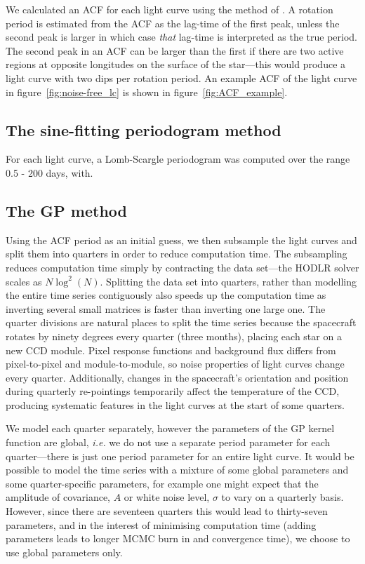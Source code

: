 We calculated an ACF for each light curve using the method of
\citet{mcquillan13}.
A rotation period is estimated from the ACF as the lag-time of the first peak,
unless the second peak is larger in which case {\it that} lag-time is
interpreted as the true period.
The second peak in an ACF can be larger than the first if there are two active
regions at opposite longitudes on the surface of the star---this would produce
a light curve with two dips per rotation period.
An example ACF of the light curve in figure~\ref{fig:noise-free_lc} is shown
in figure~\ref{fig:ACF_example}.

\subsection{The sine-fitting periodogram method}

For each light curve, a Lomb-Scargle periodogram was computed over the range
0.5 - 200 days, with.

\subsection{The GP method}

Using the ACF period as an initial guess, we then subsample the light curves
and split them into \kepler quarters in order to reduce computation time.
The subsampling reduces computation time simply by contracting the data
set---the HODLR solver scales as $N \log ^2 (N)$.
Splitting the data set into quarters, rather than modelling the entire time
series contiguously also speeds up the computation time as inverting several
small matrices is faster than inverting one large one.
The \kepler quarter divisions are natural places to split the time series
because the spacecraft rotates by ninety degrees every quarter (three months),
placing each star on a new CCD module.
Pixel response functions and background flux differs from pixel-to-pixel and
module-to-module, so noise properties of \kepler light curves change every
quarter.
Additionally, changes in the spacecraft's orientation and position during
quarterly re-pointings temporarily affect the temperature of the CCD,
producing systematic features in the light curves at the start of some
quarters.

We model each quarter separately, however the parameters of the GP kernel
function are global, {\it i.e.} we do not use a separate period parameter for
each quarter---there is just one period parameter for an entire light curve.
It would be possible to model the time series with a mixture of some global
parameters and some quarter-specific parameters, for example one might expect
that the amplitude of covariance, $A$ or white noise level, $\sigma$ to vary
on a quarterly basis.
However, since there are seventeen quarters this would lead to thirty-seven
parameters, and in the interest of minimising computation time (adding
parameters leads to longer MCMC burn in and convergence time), we choose to
use global parameters only.
